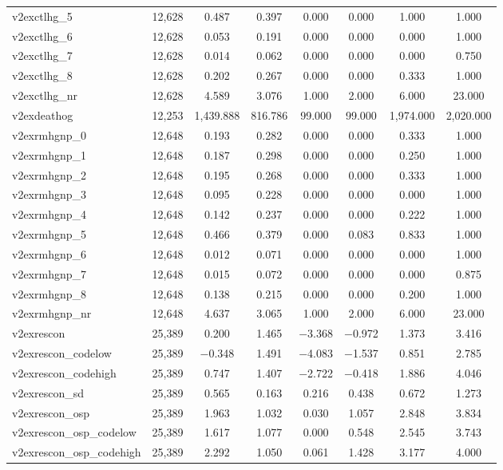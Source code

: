 \begin{table}[!htbp]
\begin{tabular}{@{\extracolsep{5pt}}lccccccc}
v2exctlhg\_5 & 12,628 & 0.487 & 0.397 & 0.000 & 0.000 & 1.000 & 1.000 \\ 
v2exctlhg\_6 & 12,628 & 0.053 & 0.191 & 0.000 & 0.000 & 0.000 & 1.000 \\ 
v2exctlhg\_7 & 12,628 & 0.014 & 0.062 & 0.000 & 0.000 & 0.000 & 0.750 \\ 
v2exctlhg\_8 & 12,628 & 0.202 & 0.267 & 0.000 & 0.000 & 0.333 & 1.000 \\ 
v2exctlhg\_nr & 12,628 & 4.589 & 3.076 & 1.000 & 2.000 & 6.000 & 23.000 \\ 
v2exdeathog & 12,253 & 1,439.888 & 816.786 & 99.000 & 99.000 & 1,974.000 & 2,020.000 \\ 
v2exrmhgnp\_0 & 12,648 & 0.193 & 0.282 & 0.000 & 0.000 & 0.333 & 1.000 \\ 
v2exrmhgnp\_1 & 12,648 & 0.187 & 0.298 & 0.000 & 0.000 & 0.250 & 1.000 \\ 
v2exrmhgnp\_2 & 12,648 & 0.195 & 0.268 & 0.000 & 0.000 & 0.333 & 1.000 \\ 
v2exrmhgnp\_3 & 12,648 & 0.095 & 0.228 & 0.000 & 0.000 & 0.000 & 1.000 \\ 
v2exrmhgnp\_4 & 12,648 & 0.142 & 0.237 & 0.000 & 0.000 & 0.222 & 1.000 \\ 
v2exrmhgnp\_5 & 12,648 & 0.466 & 0.379 & 0.000 & 0.083 & 0.833 & 1.000 \\ 
v2exrmhgnp\_6 & 12,648 & 0.012 & 0.071 & 0.000 & 0.000 & 0.000 & 1.000 \\ 
v2exrmhgnp\_7 & 12,648 & 0.015 & 0.072 & 0.000 & 0.000 & 0.000 & 0.875 \\ 
v2exrmhgnp\_8 & 12,648 & 0.138 & 0.215 & 0.000 & 0.000 & 0.200 & 1.000 \\ 
v2exrmhgnp\_nr & 12,648 & 4.637 & 3.065 & 1.000 & 2.000 & 6.000 & 23.000 \\ 
v2exrescon & 25,389 & 0.200 & 1.465 & $-$3.368 & $-$0.972 & 1.373 & 3.416 \\ 
v2exrescon\_codelow & 25,389 & $-$0.348 & 1.491 & $-$4.083 & $-$1.537 & 0.851 & 2.785 \\ 
v2exrescon\_codehigh & 25,389 & 0.747 & 1.407 & $-$2.722 & $-$0.418 & 1.886 & 4.046 \\ 
v2exrescon\_sd & 25,389 & 0.565 & 0.163 & 0.216 & 0.438 & 0.672 & 1.273 \\ 
v2exrescon\_osp & 25,389 & 1.963 & 1.032 & 0.030 & 1.057 & 2.848 & 3.834 \\ 
v2exrescon\_osp\_codelow & 25,389 & 1.617 & 1.077 & 0.000 & 0.548 & 2.545 & 3.743 \\ 
v2exrescon\_osp\_codehigh & 25,389 & 2.292 & 1.050 & 0.061 & 1.428 & 3.177 & 4.000 \\ 

\end{tabular}
\end{table}
